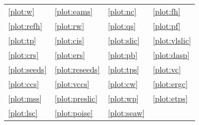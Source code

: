 	{\scriptsize
		\begin{tabularx}{0.475\textwidth}{X X X l}
			\ref{plot:w} \W &
			\ref{plot:eams} \EAMS &
			\ref{plot:nc} \NC &
			\ref{plot:fh} \FH \\
			\ref{plot:refh} \reFH &
			\ref{plot:rw} \RW &
			\ref{plot:qs} \QS &
			\ref{plot:pf} \PF \\
			\ref{plot:tp} \TP &
			\ref{plot:cis} \CIS &
			\ref{plot:slic} \SLIC &
			\ref{plot:vlslic} \vlSLIC \\
			\ref{plot:crs} \CRS &
			\ref{plot:ers} \ERS &
			\ref{plot:pb} \PB &
			\ref{plot:dasp} \DASP \\
			\ref{plot:seeds} \SEEDS &
			\ref{plot:reseeds} \reSEEDS &
			\ref{plot:tps} \TPS &
			\ref{plot:vc} \VC \\
			\ref{plot:ccs} \CCS &
			\ref{plot:vccs} \VCCS &
			\ref{plot:cw} \CW &
			\ref{plot:ergc} \ERGC \\
			\ref{plot:mss} \MSS &
			\ref{plot:preslic} \preSLIC &
			\ref{plot:wp} \WP &
			\ref{plot:etps} \ETPS \\
			\ref{plot:lsc} \LSC &
			\ref{plot:poise} \POISE &
			\ref{plot:seaw} \SEAW &
		\end{tabularx}
	}
